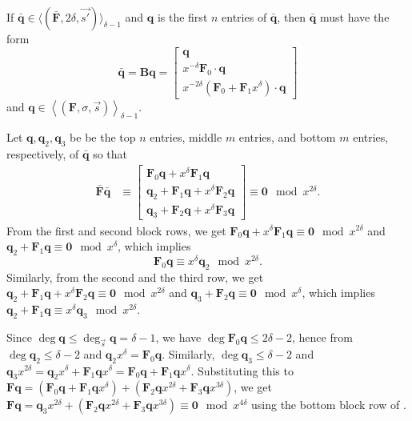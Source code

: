 \begin{lem}
\label{lem:A_delta-1Form}If $\bar{\mathbf{q}}\in\langle(\bar{\mathbf{F}},2\delta,\vec{s'})\rangle_{\delta-1}$
and $\mathbf{q}$ is the first $n$ entries of $\bar{\mathbf{q}}$,
then $\bar{\mathbf{q}}$ must have the form \[
\bar{\mathbf{q}}=\mathbf{B}\mathbf{q}=\left[\begin{array}{r}
\mathbf{q}\\
x^{-\delta}\mathbf{F}_{0}\cdot\mathbf{q}\\
x^{-2\delta}\left(\mathbf{F}_{0}+\mathbf{F}_{1}x^{\delta}\right)\cdot\mathbf{q}\end{array}\right]\]
 and $\mathbf{q}\in\left\langle \left(\mathbf{F},\sigma,\vec{s}\right)\right\rangle _{\delta-1}$.\end{lem}
\begin{pf}
Let $\mathbf{q},\mathbf{q}_{2},\mathbf{q}_{3}$ be be the top $n$
entries, middle $m$ entries, and bottom $m$ entries, respectively,
of $\mathbf{\bar{\mathbf{q}}}$ so that \begin{align}
\bar{\mathbf{F}}\bar{\mathbf{q}} & \equiv\left[\begin{array}{r}
\mathbf{F}_{0}\mathbf{q}+x^{\delta}\mathbf{F}_{1}\mathbf{q}\\
\mathbf{q}_{2}+\mathbf{F}_{1}\mathbf{q}+x^{\delta}\mathbf{F}_{2}\mathbf{q}\\
\mathbf{q}_{3}+\mathbf{F}_{2}\mathbf{q}+x^{\delta}\mathbf{F}_{3}\mathbf{q}\end{array}\right]\equiv\mathbf{0}\mod x^{2\delta}.\label{eq:Aq}\end{align}
 From the first and second block rows, we get $\mathbf{F}_{0}\mathbf{q}+x^{\delta}\mathbf{F}_{1}\mathbf{q}\equiv\mathbf{0}\mod x^{2\delta}$
and $\mathbf{q}_{2}+\mathbf{F}_{1}\mathbf{q}\equiv\mathbf{0}\mod x^{\delta}$,
which implies \begin{equation}
\mathbf{F}_{0}\mathbf{q}\equiv x^{\delta}\mathbf{q}_{2}\mod x^{2\delta}.\label{eq:q1q2}\end{equation}
 Similarly, from the second and the third row, we get $\mathbf{q}_{2}+\mathbf{F}_{1}\mathbf{q}+x^{\delta}\mathbf{F}_{2}\mathbf{q}\equiv\mathbf{0}\mod x^{2\delta}$
and $\mathbf{q}_{3}+\mathbf{F}_{2}\mathbf{q}\equiv\mathbf{0}\mod x^{\delta}$,
which implies $\mathbf{q}_{2}+\mathbf{F}_{1}\mathbf{q}\equiv x^{\delta}\mathbf{q}_{3}\mod x^{2\delta}$.

Since $\deg\mathbf{q}\le\deg_{\vec{s}}\mathbf{q}=\delta-1$, we have
$\deg\mathbf{F}_{0}\mathbf{q}\le2\delta-2$, hence from 
$\deg\mathbf{q}_{2}\le\delta-2$ and $\mathbf{q}_{2}x^{\delta}=\mathbf{F}_{0}\mathbf{q}$.
Similarly, $\deg\mathbf{q}_{3}\le\delta-2$ and $\mathbf{q}_{3}x^{2\delta}=\mathbf{q}_{2}x^{\delta}+\mathbf{F}_{1}\mathbf{q}x^{\delta}=\mathbf{F}_{0}\mathbf{q}+\mathbf{F}_{1}\mathbf{q}x^{\delta}$.
Substituting this to $\mathbf{F}\mathbf{q}=(\mathbf{F}_{0}\mathbf{q}+\mathbf{F}_{1}\mathbf{q}x^{\delta})+(\mathbf{F}_{2}\mathbf{q}x^{2\delta}+\mathbf{F}_{3}\mathbf{q}x^{3\delta})$,
we get $\mathbf{F}\mathbf{q}=\mathbf{q}_{3}x^{2\delta}+(\mathbf{F}_{2}\mathbf{q}x^{2\delta}+\mathbf{F}_{3}\mathbf{q}x^{3\delta})\equiv\mathbf{0}\mod x^{4\delta}$
using the bottom block row of .\end{pf}
